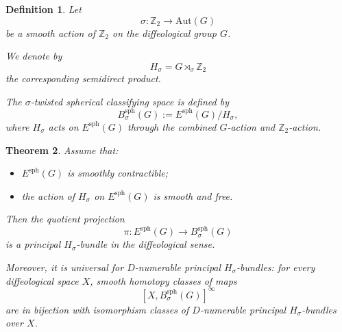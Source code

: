 \documentclass[11pt]{amsart}
\newtheorem{definition}{Definition}[section]
\newtheorem{theorem}[definition]{Theorem}
\begin{document}
\begin{definition}
Let
\[
\sigma:\mathbb Z_2\to \mathrm{Aut}(G)
\]
be a smooth action of \(\mathbb Z_2\) on the diffeological group \(G\).

We denote by
\[
H_\sigma
=
G\rtimes_\sigma \mathbb Z_2
\]
the corresponding semidirect product.

The \emph{\(\sigma\)-twisted spherical classifying space} is defined by
\[
B^{\mathrm{sph}}_\sigma(G)
:=
E^{\mathrm{sph}}(G)/H_\sigma,
\]
where \(H_\sigma\) acts on \(E^{\mathrm{sph}}(G)\) through the combined
\(G\)-action and \(\mathbb Z_2\)-action.
\end{definition}

\begin{theorem}
Assume that:
\begin{itemize}
\item \(E^{\mathrm{sph}}(G)\) is smoothly contractible;
\item the action of \(H_\sigma\) on \(E^{\mathrm{sph}}(G)\) is smooth and free.
\end{itemize}

Then the quotient projection
\[
\pi:
E^{\mathrm{sph}}(G)
\longrightarrow
B^{\mathrm{sph}}_\sigma(G)
\]
is a principal \(H_\sigma\)-bundle in the diffeological sense.

Moreover, it is universal for \(D\)-numerable principal
\(H_\sigma\)-bundles: for every diffeological space \(X\), smooth homotopy
classes of maps
\[
[X,B^{\mathrm{sph}}_\sigma(G)]^\infty
\]
are in bijection with isomorphism classes of \(D\)-numerable principal
\(H_\sigma\)-bundles over \(X\).
\end{theorem}
\end{document}

